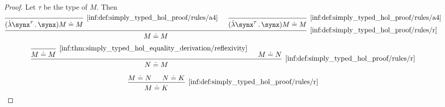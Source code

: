\begin{proof}
   Let \( \tau \) be the type of \( M \). Then
  \begin{equation*}
    \begin{prooftree}
      \infer0[\ref{inf:def:simply_typed_hol_proof/rules/a4}]{ (\qabs {\synx^\tau} \synx) M \syneq M }
      \infer0[\ref{inf:def:simply_typed_hol_proof/rules/a4}]{ (\qabs {\synx^\tau} \synx) M \syneq M }
      \infer2[\ref{inf:def:simply_typed_hol_proof/rules/r}]{ M \syneq M }
    \end{prooftree}
  \end{equation*}

  \begin{equation*}
    \begin{prooftree}
      \infer0[\ref{inf:thm:simply_typed_hol_equality_derivation/reflexivity}]{ M \syneq M }
      \hypo{ M \syneq N }
      \infer2[\ref{inf:def:simply_typed_hol_proof/rules/r}]{ N \syneq M }
    \end{prooftree}
  \end{equation*}

  \begin{equation*}
    \begin{prooftree}
      \hypo{ M \syneq N }
      \hypo{ N \syneq K }
      \infer2[\ref{inf:def:simply_typed_hol_proof/rules/r}]{ M \syneq K }
    \end{prooftree}
  \end{equation*}
\end{proof}


